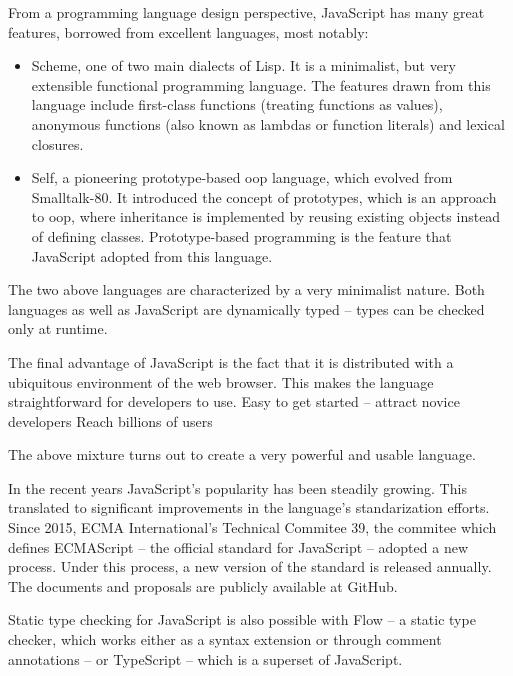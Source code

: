 From a programming language design perspective, JavaScript has many great
features, borrowed from excellent languages\cite[Section~4~Overview]{ecmascript}, most notably:
\begin{itemize}
   \item Scheme, one of two main dialects of Lisp\cite{r7rs}. It is a minimalist, but very extensible functional programming language. The features drawn from this language include first-class functions (treating functions as values), anonymous functions (also known as lambdas or function literals) and lexical closures.
   \item Self, a pioneering prototype-based \acrlong{oop} language\cite{self_handbook}, which evolved from Smalltalk-80\cite{smalltalk_history}. It introduced the concept of prototypes, which is an approach to \acrshort{oop}, where inheritance is implemented by reusing existing objects instead of defining classes. Prototype-based programming is the feature that JavaScript adopted from this language.
\end{itemize}

The two above languages are characterized by a very minimalist nature.
Both languages as well as JavaScript\cite{js_types} are dynamically typed -- types can be checked only at runtime. 

The final advantage of JavaScript is the fact that it is distributed with a ubiquitous environment of the web browser. This makes the language straightforward for developers to use.
Easy to get started -- attract novice developers
Reach billions of users\cite{internet_stats}

The above mixture turns out to create a very powerful and usable language.


In the recent years JavaScript's popularity has been steadily growing\cite{js_growth}. This translated to significant improvements in the language's standarization efforts. Since 2015, ECMA International's\cite{ecma} Technical Commitee 39\cite{tc39}, the commitee which defines ECMAScript -- the official standard for JavaScript -- adopted a new process. Under this process, a new version of the standard is released annually\cite{ecmascript, ecmascript_2015, ecmascript_2017}. The documents and proposals are publicly available at GitHub\cite{ecma_github}.


Static type checking for JavaScript is also possible with Flow\cite{js_flow} -- a static type checker, which works either as a syntax extension or through comment annotations -- or TypeScript\cite{typescript} -- which is a superset of JavaScript.

